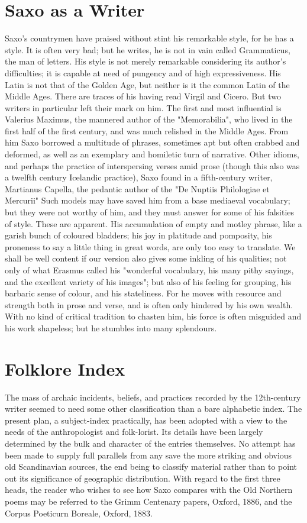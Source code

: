 \documentclass[10pt,a4paper]{report}
\begin{document}
\chapter{Saxo as a Writer}
Saxo's countrymen have praised without stint his remarkable style, for he has a style. It is often very bad; but he writes, he is not in vain called Grammaticus, the man of letters. His style is not merely remarkable considering its author's difficulties; it is capable at need of pungency and of high expressiveness. His Latin is not that of the Golden Age, but neither is it the common Latin of the Middle Ages. There are traces of his having read Virgil and Cicero. But two writers in particular left their mark on him. The first and most influential is Valerius Maximus, the mannered author of the "Memorabilia", who lived in the first half of the first century, and was much relished in the Middle Ages. From him Saxo borrowed a multitude of phrases, sometimes apt but often crabbed and deformed, as well as an exemplary and homiletic turn of narrative. Other idioms, and perhaps the practice of interspersing verses amid prose (though this also was a twelfth century Icelandic practice), Saxo found in a fifth-century writer, Martianus Capella, the pedantic author of the "De Nuptiis Philologiae et Mercurii" Such models may have saved him from a base mediaeval vocabulary; but they were not worthy of him, and they must answer for some of his falsities of style. These are apparent. His accumulation of empty and motley phrase, like a garish bunch of coloured bladders; his joy in platitude and pomposity, his proneness to say a little thing in great words, are only too easy to translate. We shall be well content if our version also gives some inkling of his qualities; not only of what Erasmus called his "wonderful vocabulary, his many pithy sayings, and the excellent variety of his images"; but also of his feeling for grouping, his barbaric sense of colour, and his stateliness. For he moves with resource and strength both in prose and verse, and is often only hindered by his own wealth. With no kind of critical tradition to chasten him, his force is often misguided and his work shapeless; but he stumbles into many splendours.

\chapter{Folklore Index}
The mass of archaic incidents, beliefs, and practices recorded by the 12th-century writer seemed to need some other classification than a bare alphabetic index. The present plan, a subject-index practically, has been adopted with a view to the needs of the anthropologist and folk-lorist. Its details have been largely determined by the bulk and character of the entries themselves. No attempt has been made to supply full parallels from any save the more striking and obvious old Scandinavian sources, the end being to classify material rather than to point out its significance of geographic distribution. With regard to the first three heads, the reader who wishes to see how Saxo compares with the Old Northern poems may be referred to the Grimm Centenary papers, Oxford, 1886, and the Corpus Poeticurn Boreale, Oxford, 1883.
\end{document}
